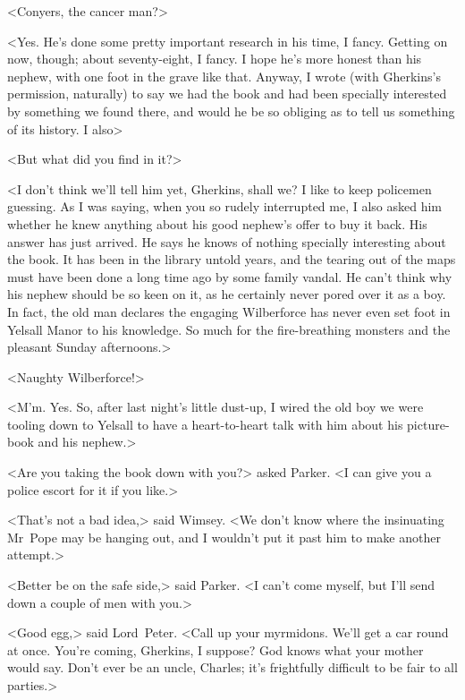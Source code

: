 <Conyers, the cancer man?>

<Yes. He's done some pretty important research in his time, I fancy. Getting on now, though; about seventy-eight, I fancy. I hope he's more honest than his nephew, with one foot in the grave like that. Anyway, I wrote (with Gherkins's permission, naturally) to say we had the book and had been specially interested by something we found there, and would he be so obliging as to tell us something of its history. I also\longdash>

<But what did you find in it?>

<I don't think we'll tell him yet, Gherkins, shall we? I like to keep policemen guessing. As I was saying, when you so rudely interrupted me, I also asked him whether he knew anything about his good nephew's offer to buy it back. His answer has just arrived. He says he knows of nothing specially interesting about the book. It has been in the library untold years, and the tearing out of the maps must have been done a long time ago by some family vandal. He can't think why his nephew should be so keen on it, as he certainly never pored over it as a boy. In fact, the old man declares the engaging Wilberforce has never even set foot in Yelsall Manor to his knowledge. So much for the fire-breathing monsters and the pleasant Sunday afternoons.>

<Naughty Wilberforce!>

<M'm. Yes. So, after last night's little dust-up, I wired the old boy we were tooling down to Yelsall to have a heart-to-heart talk with him about his picture-book and his nephew.>

<Are you taking the book down with you?> asked Parker. <I can give you a police escort for it if you like.>

<That's not a bad idea,> said Wimsey. <We don't know where the insinuating Mr~Pope may be hanging out, and I wouldn't put it past him to make another attempt.>

<Better be on the safe side,> said Parker. <I can't come myself, but I'll send down a couple of men with you.>

<Good egg,> said Lord~Peter. <Call up your myrmidons. We'll get a car round at once. You're coming, Gherkins, I suppose? God knows what your mother would say. Don't ever be an uncle, Charles; it's frightfully difficult to be fair to all parties.>

